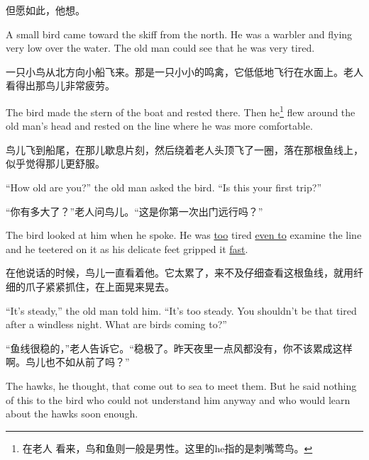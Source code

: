 \begin{paracol}{2}
\switchcolumn

但愿如此，他想。

\switchcolumn*

A small bird came toward the skiff from the north. He was a \gls{warbler} and
flying very low over the water. The old man could see that he was very
tired.

\switchcolumn

一只小鸟从北方向小船飞来。那是一只小小的鸣禽，它低低地飞行在水面上。老人看得出那鸟儿非常疲劳。

\switchcolumn*

The bird made the stern of the boat and rested there. Then he\footnote{在老人
  看来，鸟和鱼则一般是男性。这里的he指的是刺嘴莺鸟。} flew around the old man's head and rested on
the line where he was more comfortable.

\switchcolumn

鸟儿飞到船尾，在那儿歇息片刻，然后绕着老人头顶飞了一圈，落在那根鱼线上，似乎觉得那儿更舒服。

\switchcolumn*

``How old are you?'' the old man asked the bird. ``Is this your first trip?''

\switchcolumn

“你有多大了？”老人问鸟儿。“这是你第一次出门远行吗？”

\switchcolumn*

The bird looked at him when he spoke. He was \uline{too} tired \uline{even
  to} examine the line and he \gls{teetered} on it as his delicate feet
\gls{gripped} it \uline{fast}.

\switchcolumn

在他说话的时候，鸟儿一直看着他。它太累了，来不及仔细查看这根鱼线，就用纤细的爪子紧紧抓住，在上面晃来晃去。

\switchcolumn*

``It's steady,'' the old man told him. ``It's too steady. You shouldn't be
that tired after a windless night. What are birds coming to?''

\switchcolumn

“鱼线很稳的，”老人告诉它。“稳极了。昨天夜里一点风都没有，你不该累成这样啊。鸟儿也不如从前了吗？”

\switchcolumn*

The \glspl{hawk}, he thought, that come out to sea to meet them. But he said
nothing of this to the bird who could not understand him anyway and who
would learn about the hawks soon enough.

\switchcolumn


\end{paracol}

